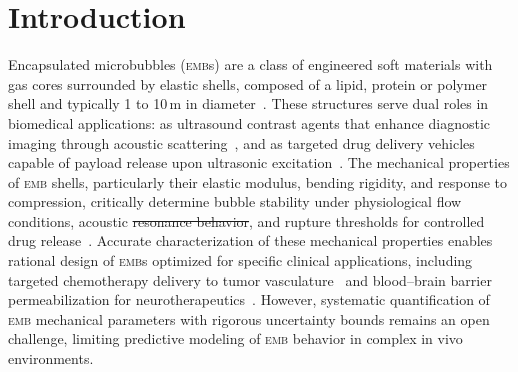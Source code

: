 \documentclass[%
 aip,
 jcp,
 amsmath,amssymb,
 preprint,%
]{revtex4-1}
\makeatletter
\providecommand{\DIFadd}[1]{{\protect\color{blue}\uwave{#1}}} %
\providecommand{\DIFdel}[1]{{\protect\color{red}\sout{#1}}} %
\providecommand{\DIFaddbegin}{} %
\providecommand{\DIFaddend}{} %
\providecommand{\DIFdelbegin}{} %
\providecommand{\DIFdelend}{} %
\let\sout@orig\sout %
\renewcommand{\sout}[1]{\ifmmode\text{\sout@orig{\ensuremath{#1}}}\else\sout@orig{#1}\fi} %
\makeatother
\begin{document}
\maketitle

\section{Introduction}

Encapsulated microbubbles (\textsc{emb}s) are a class of engineered soft materials with gas cores surrounded by elastic shells, composed of a lipid, protein or polymer shell and typically 1 to 10\,\textmu m in diameter~\citep{stride2009physical,ferrara2007ultrasound}. These structures serve dual roles in biomedical applications: as ultrasound contrast agents that enhance diagnostic imaging through acoustic scattering~\citep{klibanov2006microbubble,datta2008ultrasound}, and as targeted drug delivery vehicles capable of payload release upon ultrasonic excitation~\citep{ferrara2007ultrasound,sirsi2014state,stride2010cavitation,coussios2008applications}. The mechanical properties of \textsc{emb} shells, particularly their elastic modulus, bending rigidity, and response to compression, critically determine bubble stability under physiological flow conditions, acoustic \DIFdelbegin \DIFdel{resonance behavior}\DIFdelend \DIFaddbegin \DIFadd{response}\DIFaddend , and rupture thresholds for controlled drug release~\citep{stride2009physical,guo2013investigation,stride2010cavitation,konofagou2012optimization}. Accurate characterization of these mechanical properties enables rational design of \textsc{emb}s optimized for specific clinical applications, including targeted chemotherapy delivery to tumor vasculature~\citep{tinkov2009microbubbles,tinkov2010new} and blood--brain barrier permeabilization for neurotherapeutics~\citep{hynynen2001noninvasive}. However, systematic quantification of \textsc{emb} mechanical parameters with rigorous uncertainty bounds remains an open challenge, limiting predictive modeling of \textsc{emb} behavior in complex in vivo environments.
\end{document}
